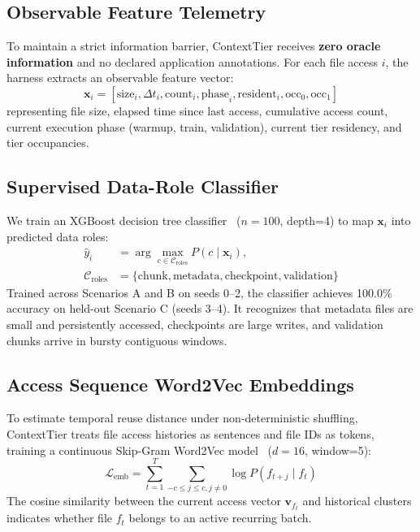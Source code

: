 \documentclass[conference]{IEEEtran}
\begin{document}
\subsection{Observable Feature Telemetry}
To maintain a strict information barrier, ContextTier receives \textbf{zero oracle information} and no declared application annotations. For each file access $i$, the harness extracts an observable feature vector:
\begin{equation}
\mathbf{x}_i = \left[ \text{size}_i, \Delta t_i, \text{count}_i, \text{phase}_i, \text{resident}_i, \text{occ}_0, \text{occ}_1 \right]
\end{equation}
representing file size, elapsed time since last access, cumulative access count, current execution phase (warmup, train, validation), current tier residency, and tier occupancies.

\subsection{Supervised Data-Role Classifier}
We train an XGBoost decision tree classifier~\cite{chen2016xgboost} ($n=100$, depth=4) to map $\mathbf{x}_i$ into predicted data roles:
\begin{align}
\hat{y}_i &= \arg\max_{c \in \mathcal{C}_{\text{roles}}} P(c \mid \mathbf{x}_i), \\
\mathcal{C}_{\text{roles}} &= \{\text{chunk}, \text{metadata}, \text{checkpoint}, \text{validation}\} \nonumber
\end{align}
Trained across Scenarios A and B on seeds 0--2, the classifier achieves 100.0\% accuracy on held-out Scenario C (seeds 3--4). It recognizes that metadata files are small and persistently accessed, checkpoints are large writes, and validation chunks arrive in bursty contiguous windows.

\subsection{Access Sequence Word2Vec Embeddings}
To estimate temporal reuse distance under non-deterministic shuffling, ContextTier treats file access histories as sentences and file IDs as tokens, training a continuous Skip-Gram Word2Vec model~\cite{mikolov2013distributed} ($d=16$, window=5):
\begin{equation}
\mathcal{L}_{\text{emb}} = \sum_{t=1}^{T} \sum_{-c \le j \le c, j \neq 0} \log P(f_{t+j} \mid f_t)
\end{equation}
The cosine similarity between the current access vector $\mathbf{v}_{f_t}$ and historical clusters indicates whether file $f_t$ belongs to an active recurring batch.
\end{document}

